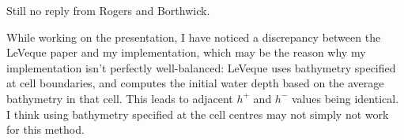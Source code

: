 \documentclass[a4paper,onecolumn,11pt]{report}
\begin{document}
Still no reply from Rogers and Borthwick.

While working on the presentation, I have noticed a discrepancy between the LeVeque paper and my implementation, which may be the reason why my implementation isn't perfectly well-balanced: LeVeque uses bathymetry specified at cell boundaries, and computes the initial water depth based on the average bathymetry in that cell. This leads to adjacent $h^+$ and $h^-$ values being identical. I think using bathymetry specified at the cell centres may not simply not work for this method.



\end{document}
